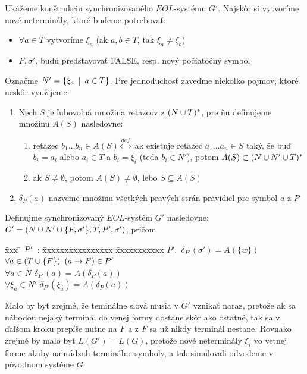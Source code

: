 \begin{dokaz}
    Ukážeme konštrukciu synchronizovaného $EOL$-systému $G'$. Najskôr
    si vytvoríme nové neterminály, ktoré budeme potrebovať:
    \begin{itemize}
    \item $\forall a\in T$ vytvoríme $\xi_a$ (ak $a,b\in T$, tak
    $\xi_a\neq\xi_b$)
    \item $F,\sigma'$, budú predstavovať FALSE, resp. nový počiatočný
    symbol
    \end{itemize}
    Označme $N'=\{\xi_a\enspace |\enspace a\in T\}$. Pre jednoduchosť zaveďme
    niekoľko pojmov, ktoré neskôr využijeme:
    \begin{enumerate}
    \item Nech $S$ je ľubovoľná množina reťazcov z $(N\cup T)^*$, pre
    ňu definujeme množinu $A(S)$ nasledovne:
    \begin{enumerate}
    \item reťazec $b_{1}\dots b_{n}\in A(S)\overset{def}
    \Longleftrightarrow$ ak existuje reťazec $a_{1}\dots a_{n}\in S$
    taký, že buď $b_i=a_i$ alebo $a_i\in T$ a $b_i=\xi_i$ (teda
    $b_i\in N'$), potom $A(S)\subset(N\cup N'\cup T)^*$
    \item ak $S\neq\emptyset$, potom $A(S)\neq\emptyset$, lebo
    $S\subseteq A(S)$
    \end{enumerate}
    \item $\delta_P(a)$ nazveme množinu všetkých pravých strán
    pravidiel pre symbol $a$ z $P$
    \end{enumerate}
    Definujme synchronizovaný $EOL$-systém $G'$ nasledovne: $G'=(N\cup
    N'\cup\{F,\sigma'\},T,P',\sigma')$, pričom
    \begin{tabbing}
    \= xxx \= $P'\enspace$: \= xxxxxxxxxxxxxxxx \= xxxxxxxxxxx \kill \>\>
    $P':$ \> $\delta_{P'}(\sigma')=A(\{w\})$\\ \>\>\> $\forall
    a\in(T\cup \{F\})$ \> $(a\rightarrow F)\in P'$\\ \>\>\> $\forall a\in N$
    \> $\delta_{P'}(a)=A(\delta_P(a))$\\ \>\>\> $\forall\xi_a\in N'$
    \> $\delta_{P'}(\xi_a)=A(\delta_P(a))$
    \end{tabbing}
    Malo by byť zrejmé, že teminálne slová musia v $G'$ vznikať naraz,
    pretože ak sa náhodou nejaký terminál do venej formy dostane skôr
    ako ostatné, tak sa v ďaľšom kroku prepíše nutne na $F$ a z $F$ sa
    už nikdy terminál nestane. Rovnako zrejmé by malo byť
    $L(G')=L(G)$, pretože nové neterminály $\xi_i$ vo vetnej forme
    akoby nahrádzali terminálne symboly, a tak simulovali odvodenie v
    pôvodnom systéme $G$
\end{dokaz}

